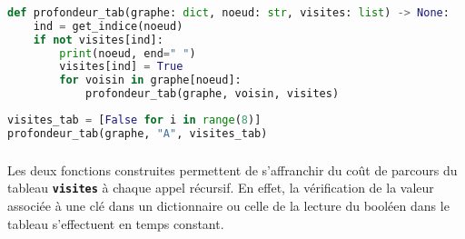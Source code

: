 \documentclass[svgnames,11pt]{beamer}
\begin{document}
\begin{frame}[fragile]
    \frametitle{}

\begin{center}
\begin{lstlisting}[language=Python , basicstyle=\ttfamily\small, xleftmargin=0.2em, xrightmargin=0em]
def profondeur_tab(graphe: dict, noeud: str, visites: list) -> None:
    ind = get_indice(noeud)
    if not visites[ind]:
        print(noeud, end=" ")
        visites[ind] = True
        for voisin in graphe[noeud]:
            profondeur_tab(graphe, voisin, visites)
\end{lstlisting}

\begin{lstlisting}[language=Python , basicstyle=\ttfamily\small, xleftmargin=0.2em, xrightmargin=0em]
visites_tab = [False for i in range(8)]
profondeur_tab(graphe, "A", visites_tab)
\end{lstlisting}
\end{center} 

\end{frame}
\begin{frame}
    \frametitle{}

    \begin{aretenir}[Observation]
Les deux fonctions construites permettent de s'affranchir du coût de parcours du tableau \textbf{\texttt{visites}} à chaque appel récursif. En effet, la vérification de la valeur associée à une clé dans un dictionnaire ou celle de la lecture du booléen dans le tableau s'effectuent en temps constant.
    \end{aretenir}

\end{frame}
\end{document}
